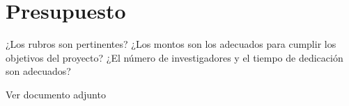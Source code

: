 \documentclass[11pt]{article}
\begin{document}
\section{ Presupuesto}
\begin{instrucciones}
  ¿Los rubros son pertinentes? ¿Los montos son los adecuados para cumplir los objetivos del proyecto? ¿El número de investigadores y el tiempo de dedicación son adecuados?
\end{instrucciones}
Ver documento adjunto 


\end{document}
